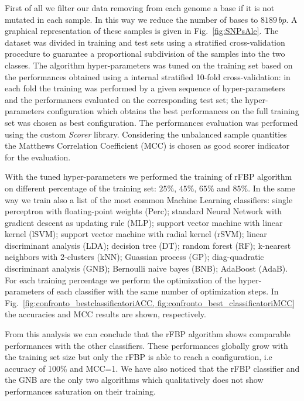 \documentclass{standalone}
\begin{document}
First of all we filter our data removing from each genome a base if it is not mutated in each sample.
In this way we reduce the number of bases to $8189\,bp$.
A graphical representation of these samples is given in Fig.~\ref{fig:SNPsAle}.
The dataset was divided in training and test sets using a stratified cross-validation procedure to guarantee a proportional subdivision of the samples into the two classes.
The algorithm hyper-parameters was tuned on the training set based on the performances obtained using a internal stratified 10-fold cross-validation: in each fold the training was performed by a given sequence of hyper-parameters and the performances evaluated on the corresponding test set; the hyper-parameters configuration which obtains the best performances on the full training set was chosen as best configuration.
The performances evaluation was performed using the custom \emph{Scorer} library.
Considering the unbalanced sample quantities the Matthews Correlation Coefficient (MCC) is chosen as good scorer indicator for the evaluation.

With the tuned hyper-parameters we performed the training of rFBP algorithm on different percentage of the training set: $25\%$, $45\%$, $65\%$ and $85\%$.
In the same way we train also a list of the most common Machine Learning classifiers: single perceptron with floating-point weights (Perc); standard Neural Network with gradient descent as updating rule (MLP); support vector machine with linear kernel (lSVM); support vector machine with radial kernel (rSVM); linear discriminant analysis (LDA); decision tree (DT); random forest (RF); k-nearest neighbors with 2-clusters (kNN); Guassian process (GP); diag-quadratic discriminant analysis (GNB); Bernoulli naive bayes (BNB); AdaBoost (AdaB).
For each training percentage we perform the optimization of the hyper-parameters of each classifier with the same number of optimization steps.
In Fig.~\ref{fig:confronto_bestclassificatoriACC, fig:confronto_best_classificatoriMCC} the accuracies and MCC results are shown, respectively.

From this analysis we can conclude that the rFBP algorithm shows comparable performances with the other classifiers.
These performances globally grow with the training set size but only the rFBP is able to reach a  configuration, i.e accuracy of 100\% and MCC=1.
We have also noticed that the rFBP classifier and the GNB are the only two algorithms which qualitatively does not show performances saturation on their training.
\end{document}
